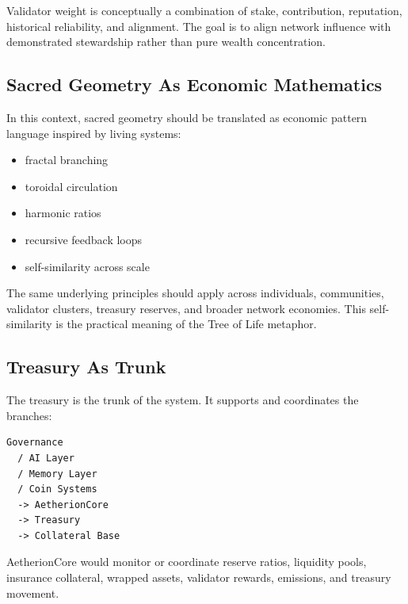 ﻿\documentclass[12pt]{article}
\begin{document}
Validator weight is conceptually a combination of stake, contribution, reputation, historical reliability, and alignment. The goal is to align network influence with demonstrated stewardship rather than pure wealth concentration.

\subsection{Sacred Geometry As Economic Mathematics}


In this context, sacred geometry should be translated as economic pattern language inspired by living systems:

\begin{itemize}
  \item fractal branching
\end{itemize}
\begin{itemize}
  \item toroidal circulation
\end{itemize}
\begin{itemize}
  \item harmonic ratios
\end{itemize}
\begin{itemize}
  \item recursive feedback loops
\end{itemize}
\begin{itemize}
  \item self-similarity across scale
\end{itemize}

The same underlying principles should apply across individuals, communities, validator clusters, treasury reserves, and broader network economies. This self-similarity is the practical meaning of the Tree of Life metaphor.

\subsection{Treasury As Trunk}


The treasury is the trunk of the system. It supports and coordinates the branches:

\begin{verbatim}
Governance
  / AI Layer
  / Memory Layer
  / Coin Systems
  -> AetherionCore
  -> Treasury
  -> Collateral Base
\end{verbatim}

AetherionCore would monitor or coordinate reserve ratios, liquidity pools, insurance collateral, wrapped assets, validator rewards, emissions, and treasury movement.
\end{document}
